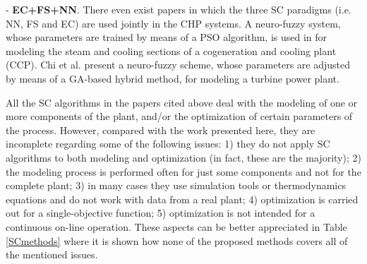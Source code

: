 - \textbf{EC+FS+NN}.  There even exist papers in which the three SC paradigms (i.e. NN, FS and EC) are used jointly in the CHP systems. A neuro-fuzzy system, whose parameters are trained by means of a PSO algorithm, is used in \cite{Tamiru-2009} for modeling  the steam and cooling sections of a cogeneration and cooling plant (CCP). Chi et al. \cite{Kwun-2007} present a neuro-fuzzy scheme, whose parameters are adjusted by means of a GA-based hybrid method, for modeling a turbine power plant. 

All the SC algorithms in the papers cited above deal with the modeling of one or more components of the plant, and/or the optimization of certain parameters of the process. However, compared with the work presented here, they are incomplete regarding some of the following issues: 1) they do not apply SC algorithms to both modeling and optimization (in fact, these are the majority); 2) the modeling process is performed often for just some components and not for the complete plant; 3) in many cases they use simulation tools or thermodynamics equations and do not work with data from a real plant; 4) optimization is carried out for a single-objective function; 5) optimization is not intended for a continuous on-line operation. These aspects can be better appreciated in Table \ref{SCmethods} where it is shown how none of the proposed methods covers all of the mentioned issues.


